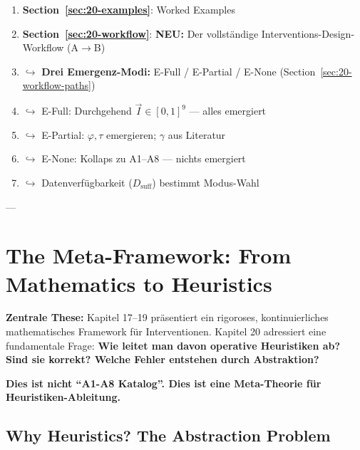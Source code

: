 \begin{tcolorbox}[colback=green!5!white, colframe=green!75!black,
    title=Chapter Overview]
\begin{enumerate}
\item \textbf{Section~\ref{sec:20-examples}}: Worked Examples
\item \textbf{Section~\ref{sec:20-workflow}}: \textbf{NEU:} Der vollständige Interventions-Design-Workflow (A$\to$B)
\item[] \quad $\hookrightarrow$ \textbf{Drei Emergenz-Modi:} E-Full / E-Partial / E-None (Section~\ref{sec:20-workflow-paths})
\item[] \quad $\hookrightarrow$ E-Full: Durchgehend $\vec{I} \in [0,1]^9$ --- alles emergiert
\item[] \quad $\hookrightarrow$ E-Partial: $\varphi, \tau$ emergieren; $\gamma$ aus Literatur
\item[] \quad $\hookrightarrow$ E-None: Kollaps zu A1--A8 --- nichts emergiert
\item[] \quad $\hookrightarrow$ Datenverfügbarkeit ($D_{\text{suff}}$) bestimmt Modus-Wahl
\end{enumerate}
\end{tcolorbox}

---

\section{The Meta-Framework: From Mathematics to Heuristics}
\label{sec:20-meta}

\textbf{Zentrale These:} Kapitel 17--19 präsentiert ein rigoroses, kontinuierliches mathematisches Framework für Interventionen. Kapitel 20 adressiert eine fundamentale Frage: \textbf{Wie leitet man davon operative Heuristiken ab? Sind sie korrekt? Welche Fehler entstehen durch Abstraktion?}

\textbf{Dies ist nicht ``A1-A8 Katalog''. Dies ist eine Meta-Theorie für Heuristiken-Ableitung.}

\subsection{Why Heuristics? The Abstraction Problem}
\label{subsec:20-why-abstraction}

